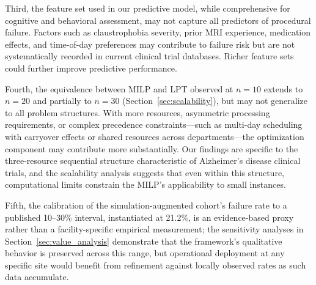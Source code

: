 \documentclass[11pt,a4paper]{article}
\begin{document}
Third, the feature set used in our predictive model, while comprehensive for cognitive and behavioral assessment, may not capture all predictors of procedural failure. Factors such as claustrophobia severity, prior MRI experience, medication effects, and time-of-day preferences may contribute to failure risk but are not systematically recorded in current clinical trial databases. Richer feature sets could further improve predictive performance.

Fourth, the equivalence between MILP and LPT observed at $n = 10$ extends to $n = 20$ and partially to $n = 30$ (Section~\ref{sec:scalability}), but may not generalize to all problem structures. With more resources, asymmetric processing requirements, or complex precedence constraints---such as multi-day scheduling with carryover effects or shared resources across departments---the optimization component may contribute more substantially. Our findings are specific to the three-resource sequential structure characteristic of Alzheimer's disease clinical trials, and the scalability analysis suggests that even within this structure, computational limits constrain the MILP's applicability to small instances.

Fifth, the calibration of the simulation-augmented cohort's failure rate to a published 10--30\% interval, instantiated at 21.2\%, is an evidence-based proxy rather than a facility-specific empirical measurement; the sensitivity analyses in Section~\ref{sec:value_analysis} demonstrate that the framework's qualitative behavior is preserved across this range, but operational deployment at any specific site would benefit from refinement against locally observed rates as such data accumulate.
\end{document}
